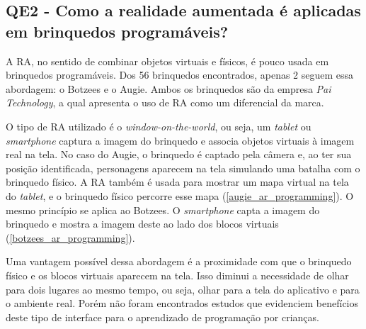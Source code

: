 {\subsection{QE2 - Como a realidade aumentada é aplicadas em brinquedos programáveis?}
A \ac{RA}, no sentido de combinar objetos virtuais e físicos, é pouco usada em brinquedos programáveis. Dos 56 brinquedos encontrados, apenas 2 seguem essa abordagem: o Botzees e o Augie. Ambos os brinquedos são da empresa \textit{Pai Technology}, a qual apresenta o uso de \ac{RA} como um diferencial da marca.

O tipo de RA utilizado é o \textit{window-on-the-world}, ou seja, um \textit{tablet} ou \textit{smartphone} captura a imagem do brinquedo e associa objetos virtuais à imagem real na tela. No caso do Augie, o brinquedo é captado pela câmera e, ao ter sua posição identificada, personagens aparecem na tela simulando uma batalha com o brinquedo físico. A RA também é usada para mostrar um mapa virtual na tela do \textit{tablet}, e o brinquedo físico percorre esse mapa (\autoref{augie_ar_programming}). O mesmo princípio se aplica ao Botzees. O \textit{smartphone} capta a imagem do brinquedo e mostra a imagem deste ao lado dos blocos virtuais (\autoref{botzees_ar_programming}).

Uma vantagem possível dessa abordagem é a proximidade com que o brinquedo físico e os blocos virtuais aparecem na tela. Isso diminui a necessidade de olhar para dois lugares ao mesmo tempo, ou seja, olhar para a tela do aplicativo e para o ambiente real. Porém não foram encontrados estudos que evidenciem benefícios deste tipo de interface para o aprendizado de programação por crianças. 

}
